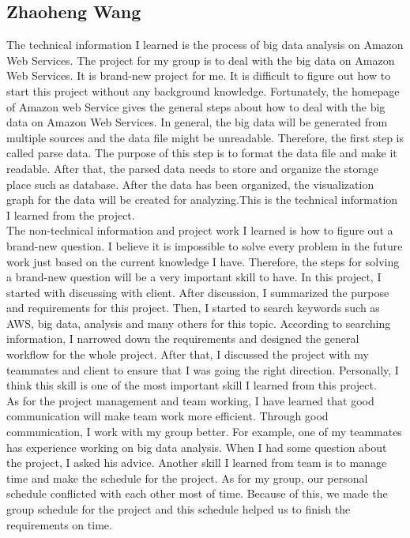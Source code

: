 \subsection{Zhaoheng Wang}
    	 \noindent The technical information I learned is the process of big data analysis on Amazon Web Services. The project for my group is to deal with the big data on Amazon Web Services. It is brand-new project for me. It is difficult to figure out how to start this project without any background knowledge. Fortunately, the homepage of Amazon web Service gives the general steps about how to deal with the big data on Amazon Web Services. In general, the big data will be generated from multiple sources and the data file might be unreadable. Therefore, the first step is called parse data. The purpose of this step is to format the data file and make it readable. After that, the parsed data needs to store and organize the storage place such as database. After the data has been organized, the visualization graph for the data will be created for analyzing.This is the technical information I learned from the project. \\
         
         \noindent The non-technical information and project work I learned is how to figure out a brand-new question. I believe it is impossible to solve every problem in the future work just based on the current knowledge I have. Therefore, the steps for solving a brand-new question will be a very important skill to have. In this project, I started with discussing with client. After discussion, I summarized the purpose and requirements for this project. Then, I started to search keywords such as AWS, big data, analysis and many others for this topic. According to searching information, I narrowed down the requirements and designed the general workflow for the whole project. After that, I discussed the project with my teammates and client to ensure that I was going the right direction. Personally, I think this skill is one of the most important skill I learned from this project.\\
         
         \noindent As for the project management and team working, I have learned that good communication will make team work more efficient. Through good communication, I work with my group better. For example, one of my teammates has experience working on big data analysis. When I had some question about the project, I asked his advice. Another skill I learned from team is to manage time and make the schedule for the project. As for my group, our personal schedule conflicted with each other most of time. Because of this, we made the group schedule for the project and this schedule helped us to finish the requirements on time.\\
         
